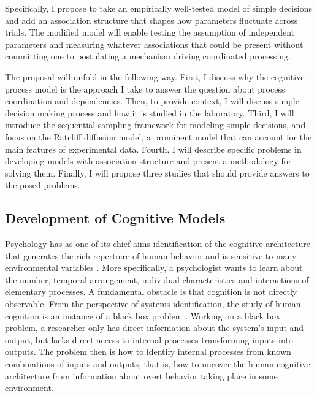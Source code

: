 \documentclass[12pt]{article}
\begin{document}
Specifically, I propose to take an empirically well-tested model of
simple decisions and add an association structure that shapes how
parameters fluctuate across trials. The modified model will enable testing the
assumption of independent parameters and measuring whatever associations that could be present without committing one to postulating a mechanism driving coordinated processing. 
    
The proposal will unfold in the following way. First, I discuss why the
cognitive process model is the approach I take to answer the
question about process coordination and dependencies. Then, to provide
context, I will discuss simple decision making process and how it is studied in the laboratory. Third, I will
introduce the sequential sampling framework for modeling simple
decisions, and focus on the Ratcliff diffusion model, a prominent
model that can account for the main features of
experimental data. Fourth, I will describe specific problems in developing
models with association structure and present a methodology for
solving them. Finally, I will propose three studies that should
provide answers to the posed problems.

\subsection{Development of Cognitive Models}

Psychology has as one of its chief aims identification of the cognitive
architecture that generates the rich repertoire of human behavior and is
sensitive to many environmental variables \citep{AndBot2004,And2007}. More
specifically, a psychologist wants to learn about the number, temporal
arrangement, individual characteristics and interactions of elementary
processes. A fundamental obstacle is
that cognition is not directly observable. From the perspective of systems
identification, the study of human cognition is an instance of a black box
problem \citep{Lju1999, Lju2010}. Working on a black box problem, a
researcher only has direct information about the system's input and
output, but lacks direct access to internal processes transforming inputs
into outputs. The problem then is how to identify internal processes from
known combinations of inputs and outputs, that is, how to uncover the human
cognitive architecture from information about overt behavior taking place
in some environment.
\end{document}

